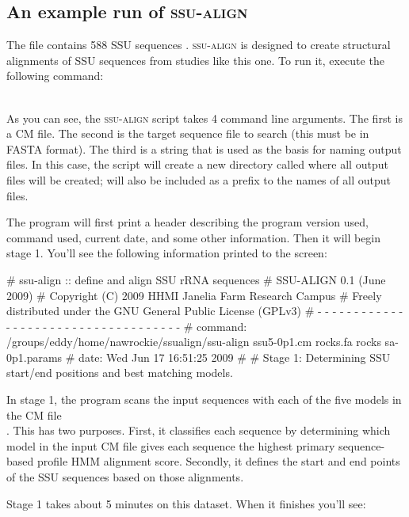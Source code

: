 \subsection{An example run of \textsc{ssu-align}}

The file  contains 588 SSU sequences
\cite{Walker07}. \textsc{ssu-align} is designed to create structural
alignments of SSU sequences from studies like this one. To run it,
execute the following command:

\\

As you can see, the \textsc{ssu-align} script takes 4 command line
arguments. The first is a CM file. The second is the target sequence
file to search (this must be in FASTA format). The third is a string
that is used as the basis for naming output files. In this case, the
script will create a new directory called  where all
output files will be created;  will also be included as a
prefix to the names of all output files.

\newpage

The program will first print a header describing the program version
used, command used, current date, and some other information. Then it
will begin stage 1. You'll see the following information printed to
the screen:

\begin{sreoutput}
# ssu-align :: define and align SSU rRNA sequences
# SSU-ALIGN 0.1 (June 2009)
# Copyright (C) 2009 HHMI Janelia Farm Research Campus
# Freely distributed under the GNU General Public License (GPLv3)
# - - - - - - - - - - - - - - - - - - - - - - - - - - - - - - - - - - - -
# command: /groups/eddy/home/nawrockie/ssualign/ssu-align ssu5-0p1.cm rocks.fa rocks sa-0p1.params
# date:    Wed Jun 17 16:51:25 2009
#
# Stage 1: Determining SSU start/end positions and best matching models.
\end{sreoutput}

In stage 1, the program scans the input sequences with each of the
five models in the CM file \\ . This has two
purposes.  First, it classifies each sequence by determining which
model in the input CM file gives each sequence the highest primary
sequence-based profile HMM alignment score. Secondly, it
defines the start and end points of the SSU sequences based on those
alignments.

Stage 1 takes about 5 minutes on this dataset. When it finishes you'll
see: 

